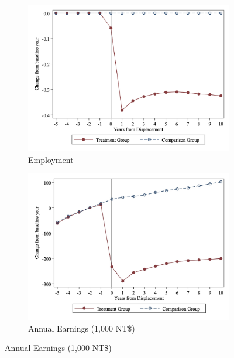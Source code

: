 \documentclass[12pt]{article}
\begin{document}
\begin{figure}[H]  %
\begin{center}
\caption{Trend in Employment and Annual Earnings}\label{emp}
	\begin{subfigure}[b]{0.65\textwidth}
	 	\caption{Employment}\label{emp_e}
		\vspace{-0.85em}
	 	\includegraphics[width=\textwidth]{figures/Figure1_d_employed.png}  %
	 \end{subfigure}
	 \begin{subfigure}[b]{0.65\textwidth}
		\caption{Annual Earnings (1,000 NT\$)}\label{earnings}
		\vspace{-0.85em}
		\includegraphics[width=\textwidth]{figures/Figure1_real_wage.jpg}
        \end{subfigure}
\end{center}
\end{figure}
\vspace{-3em}
\end{document}
